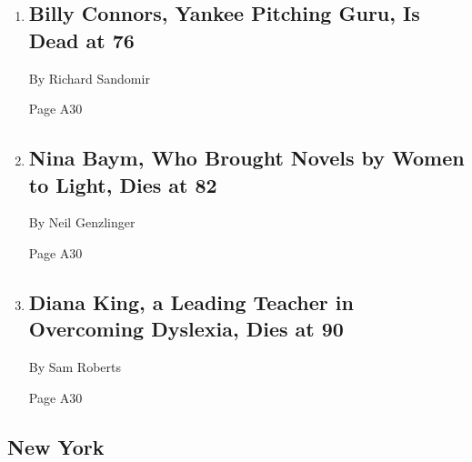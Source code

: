 \begin{enumerate}
\def\labelenumi{\arabic{enumi}.}
\item
  \href{/2018/06/21/obituaries/billy-connors-yankee-pitching-guru-is-dead-at-76.html}{}

  \hypertarget{billy-connors-yankee-pitching-guru-is-dead-at-76}{%
  \subsection{Billy Connors, Yankee Pitching Guru, Is Dead at
  76}\label{billy-connors-yankee-pitching-guru-is-dead-at-76}}

  By Richard Sandomir

  Page A30
\item
  \href{/2018/06/22/obituaries/nina-baym-who-brought-novels-by-women-to-light-dies-at-82.html}{}

  \hypertarget{nina-baym-who-brought-novels-by-women-to-light-dies-at-82}{%
  \subsection{Nina Baym, Who Brought Novels by Women to Light, Dies at
  82}\label{nina-baym-who-brought-novels-by-women-to-light-dies-at-82}}

  By Neil Genzlinger

  Page A30
\item
  \href{/2018/06/22/obituaries/diana-king-a-leading-teacher-in-overcoming-dyslexia-dies-at-90.html}{}

  \hypertarget{diana-king-a-leading-teacher-in-overcoming-dyslexia-dies-at-90}{%
  \subsection{Diana King, a Leading Teacher in Overcoming Dyslexia, Dies
  at
  90}\label{diana-king-a-leading-teacher-in-overcoming-dyslexia-dies-at-90}}

  By Sam Roberts

  Page A30
\end{enumerate}

\hypertarget{new-york}{%
\subsection{New York}\label{new-york}}

